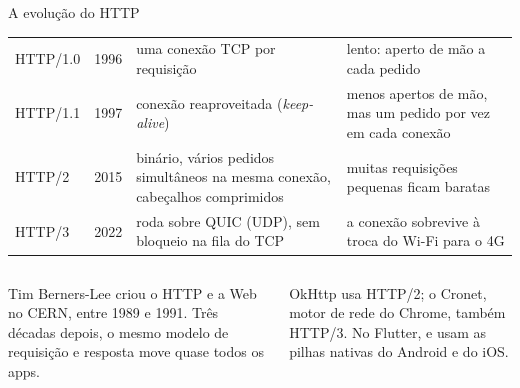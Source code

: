 \begin{frame}{A evolução do HTTP}
  \scriptsize
  \begin{tabularx}{\textwidth}{@{}l l L L@{}}
    \toprule
     &  &  &  \\
    \midrule
    HTTP/1.0 & 1996 & uma conexão TCP por requisição & lento: aperto de mão a cada pedido \\
    HTTP/1.1 & 1997 & conexão reaproveitada (\emph{keep-alive}) & menos apertos de mão, mas um pedido por vez em cada conexão \\
    HTTP/2 & 2015 & binário, vários pedidos simultâneos na mesma conexão, cabeçalhos comprimidos & muitas requisições pequenas ficam baratas \\
    HTTP/3 & 2022 & roda sobre QUIC (UDP), sem bloqueio na fila do TCP & a conexão sobrevive à troca do Wi-Fi para o 4G \\
    \bottomrule
  \end{tabularx}
  \normalsize
  \vspace{4pt}
  \begin{columns}[T]
    \begin{column}{0.49\textwidth}
      \begin{historia}
        Tim Berners-Lee criou o HTTP e a Web no CERN, entre 1989 e 1991. Três décadas depois, o mesmo modelo de requisição e resposta move quase todos os apps.
      \end{historia}
    \end{column}
    \begin{column}{0.49\textwidth}
      \begin{pordentro}
        OkHttp usa HTTP/2; o Cronet, motor de rede do Chrome, também HTTP/3. No Flutter,  e  usam as pilhas nativas do Android e do iOS.
      \end{pordentro}
    \end{column}
  \end{columns}
\end{frame}

